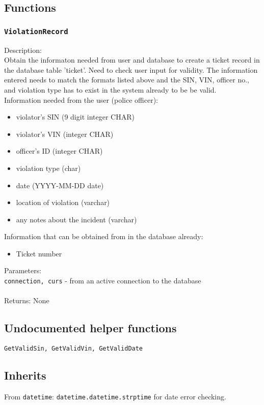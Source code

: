 \documentclass[12pt]{article}
\begin{document}
\subsection{Functions}

\subsubsection{\texttt{ViolationRecord}}
Description:\\
\indent Obtain the informaton needed from user and database to create a 
    ticket record in the database table 'ticket'. Need to check user input
    for validity. The information entered needs to match the formats listed
    above and the SIN, VIN, officer no., and violation type has to exist in 
    the system already to be be valid.\\
Information needed from the user (police officer):
\begin{itemize}
\item violator's SIN (9 digit integer CHAR)
\item violator's VIN (integer CHAR)
\item officer's ID   (integer CHAR)
\item violation type (char)
\item date           (YYYY-MM-DD date)
\item location of violation  (varchar)
\item any notes about the incident  (varchar)
\end{itemize}
Information that can be obtained from in the database already:
\begin{itemize}
\item Ticket number
\end{itemize}
Parameters:\\
\indent\texttt{connection, curs} - from an active connection to the database\\\\
Returns: None

\subsection{Undocumented helper functions}
\texttt{GetValidSin, GetValidVin, GetValidDate}

\subsection{Inherits}
From \texttt{datetime}: \texttt{datetime.datetime.strptime} for date error checking.
\end{document}
